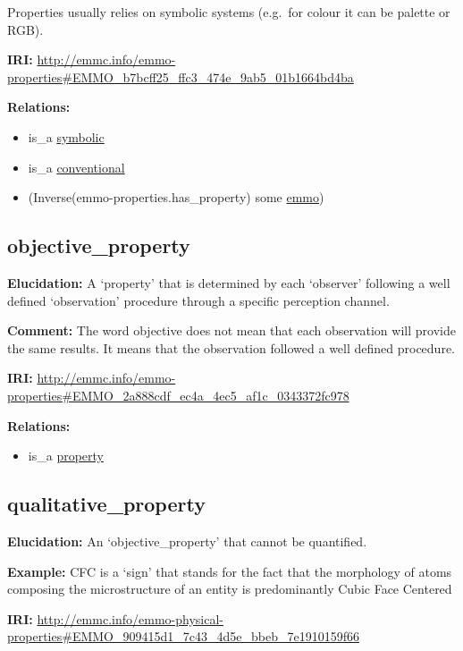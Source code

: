 \documentclass[a4paper,]{report}
\providecommand{\tightlist}{%
  \setlength{\itemsep}{0pt}\setlength{\parskip}{0pt}}
\begin{document}
Properties usually relies on symbolic systems (e.g.~for colour it can be
palette or RGB).

\textbf{IRI:}
\url{http://emmc.info/emmo-properties\#EMMO_b7bcff25_ffc3_474e_9ab5_01b1664bd4ba}

\textbf{Relations:}

\begin{itemize}
\tightlist
\item
  is\_a \protect\hyperlink{symbolic}{symbolic}
\item
  is\_a \protect\hyperlink{conventional}{conventional}
\item
  (Inverse(emmo-properties.has\_property) some
  \protect\hyperlink{emmo}{emmo})
\end{itemize}

\hypertarget{objective_property}{%
\subsection{objective\_property}\label{objective_property}}

\textbf{Elucidation:} A `property' that is determined by each `observer'
following a well defined `observation' procedure through a specific
perception channel.

\textbf{Comment:} The word objective does not mean that each observation
will provide the same results. It means that the observation followed a
well defined procedure.

\textbf{IRI:}
\url{http://emmc.info/emmo-properties\#EMMO_2a888cdf_ec4a_4ec5_af1c_0343372fc978}

\textbf{Relations:}

\begin{itemize}
\tightlist
\item
  is\_a \protect\hyperlink{property}{property}
\end{itemize}

\hypertarget{qualitative_property}{%
\subsection{qualitative\_property}\label{qualitative_property}}

\textbf{Elucidation:} An `objective\_property' that cannot be
quantified.

\textbf{Example:} CFC is a `sign' that stands for the fact that the
morphology of atoms composing the microstructure of an entity is
predominantly Cubic Face Centered

\textbf{IRI:}
\url{http://emmc.info/emmo-physical-properties\#EMMO_909415d1_7c43_4d5e_bbeb_7e1910159f66}
\end{document}
